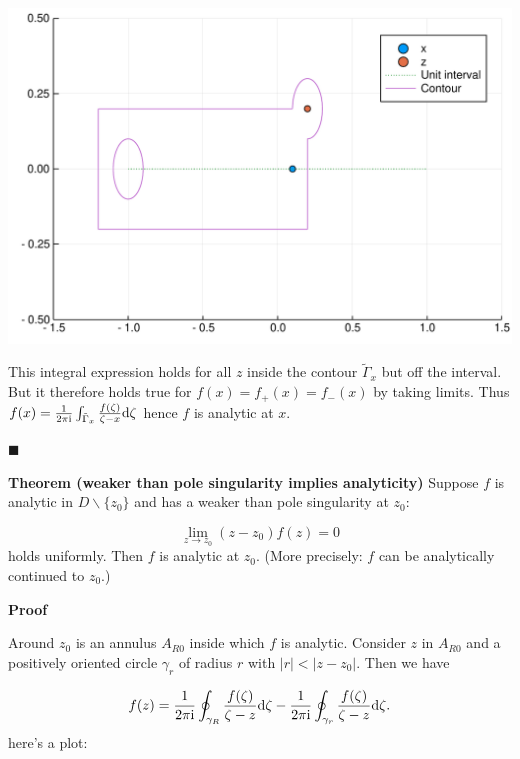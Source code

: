 \documentclass[12pt,a4paper]{article}
\def\D{ {\rm d} }
\def\I{ {\rm i} }
\def\mdblksquare{\blacksquare}
\begin{document}
\includegraphics[width=\linewidth]{figures/Lecture10_10_1.pdf}

This integral expression holds for all $z$ inside the contour $\tilde \Gamma_x$ but off the interval.   But it therefore holds true for $f(x) = f_+(x) = f_-(x)$ by taking limits.  Thus $f(x) = {1 \over 2 \pi \I} \int_{{\tilde \Gamma}_x} {f(\zeta) \over \zeta -x} \D\zeta$ hence $f$ is analytic at $x$.

\ensuremath{\mdblksquare}

\textbf{Theorem (weaker than pole singularity implies analyticity)} Suppose $f$ is analytic in  $D \backslash \{ z_0 \}$ and has a weaker than pole singularity at $z_0$:

\[
\lim_{z \rightarrow z_0} (z-z_0) f(z) = 0
\]
holds uniformly. Then $f$ is analytic at $z_0$. (More precisely: $f$ can be analytically continued to $z_0$.)

\textbf{Proof} 

Around $z_0$ is an annulus $A_{R0}$ inside which $f$ is analytic.  Consider $z$ in $A_{R0}$ and a positively oriented circle $\gamma_r$ of radius $r$ with $|r| < |z-z_0|$.   Then we have

\[
    f(z) = {1 \over 2 \pi \I} \oint_{\gamma_R} {f(\zeta) \over \zeta - z} \D \zeta - {1 \over 2 \pi \I} \oint_{\gamma_r} {f(\zeta) \over \zeta - z} \D \zeta .
\]
here's a plot:
\end{document}
